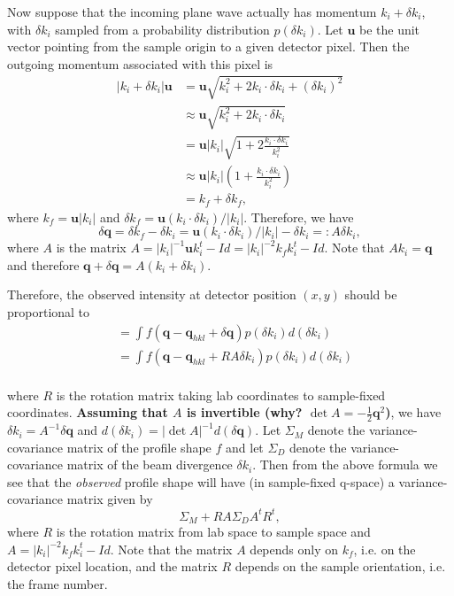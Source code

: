 \documentclass[11pt,a4paper]{article}
\newcommand{\bq}{\mathbf{q}}
\newcommand{\bu}{\mathbf{u}}
\begin{document}
Now suppose that the incoming plane wave actually has momentum $k_i + \delta k_i$, with $\delta k_i$ sampled from a probability distribution $p(\delta k_i)$. Let $\bu$ be the unit vector pointing from the sample origin to a given detector pixel. Then the outgoing momentum associated with this pixel is
\begin{align}
  |k_i + \delta k_i| \bu &= \bu \sqrt{k_i^2  + 2 k_i \cdot \delta k_i + (\delta k_i)^2 } \\
  &\approx \bu\sqrt{k_i^2  + 2 k_i \cdot \delta k_i} \\
  &= \bu|k_i|\sqrt{1+ 2\frac{k_i \cdot \delta k_i}{k_i^2}} \\
  &\approx \bu|k_i| \left(1 +  \frac{k_i \cdot \delta k_i}{k_i^2}\right) \\
  &= k_f + \delta k_f,
\end{align}
where $k_f = \bu|k_i|$ and $\delta k_f = \bu(k_i \cdot \delta k_i) / |k_i|$. Therefore, we have
\begin{equation} \delta\bq = \delta k_f - \delta k_i = \bu(k_i \cdot \delta k_i) / |k_i| - \delta k_i =: A \delta k_i, \end{equation}
where $A$ is the matrix $A = |k_i|^{-1} \bu k_i^t - Id = |k_i|^{-2} k_f k_i^t - Id$. Note that $A k_i = \bq$ and therefore
$\bq + \delta \bq = A(k_i + \delta k_i)$.

Therefore, the observed intensity at detector position $(x,y)$ should be proportional to
\begin{align}
  &= \int f(\bq - \bq_{hkl} + \delta \bq) p(\delta k_i) d(\delta k_i) \\
  &= \int f(\bq - \bq_{hkl} + RA \delta k_i) p(\delta k_i) d(\delta k_i) \\
\end{align}

where $R$ is the rotation matrix taking lab coordinates to sample-fixed coordinates.
\textbf{Assuming that $A$ is invertible (why? $\det A = -\frac{1}{2}\bq^2$)}, we have $\delta k_i = A^{-1} \delta \bq$ and $d(\delta k_i) = |\det A|^{-1} d(\delta \bq)$. Let $\Sigma_M$ denote the variance-covariance matrix of the profile shape $f$ and let $\Sigma_D$ denote the variance-covariance matrix of the beam divergence $\delta k_i$. Then from the above formula we see that the \emph{observed} profile shape will have (in sample-fixed q-space) a variance-covariance matrix given by
\begin{equation} \Sigma_M + R A \Sigma_D A^t R^t, \end{equation}
where $R$ is the rotation matrix from lab space to sample space and $A = |k_i|^{-2} k_f k_i^t - Id$.
Note that the matrix $A$ depends only on $k_f$, i.e. on the detector pixel location, and the matrix $R$ depends on the sample orientation, i.e. the frame number.
\end{document}
